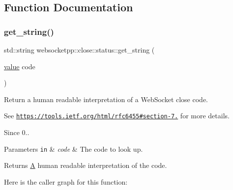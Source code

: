 \subsection{Function Documentation}
\mbox{\label{namespacewebsocketpp_1_1close_1_1status_a4bf4987c79165b134ed1207a567ce209}} 
\subsubsection{\texorpdfstring{get\+\_\+string()}{get\_string()}}
{\footnotesize\ttfamily std\+::string websocketpp\+::close\+::status\+::get\+\_\+string (\begin{DoxyParamCaption}\item[{\mbox{\hyperlink{namespacewebsocketpp_1_1close_1_1status_a8614a5c4733d708e2d2a32191c5bef84}{value}}}]{code }\end{DoxyParamCaption})\hspace{0.3cm}{\ttfamily [inline]}}



Return a human readable interpretation of a Web\+Socket close code. 

See \href{https://tools.ietf.org/html/rfc6455#section-7.4}{\tt https\+://tools.\+ietf.\+org/html/rfc6455\#section-\/7.} for more details.

\begin{DoxySince}{Since}
0..
\end{DoxySince}

\begin{DoxyParams}[1]{Parameters}
\mbox{\tt in}  & {\em code} & The code to look up. \\
\hline
\end{DoxyParams}
\begin{DoxyReturn}{Returns}
\mbox{\hyperlink{struct_a}{A}} human readable interpretation of the code. 
\end{DoxyReturn}
Here is the caller graph for this function\+:
\mbox{\label{namespacewebsocketpp_1_1close_1_1status_ad024f852889be28eadcec8209fdf9bc8}} 
